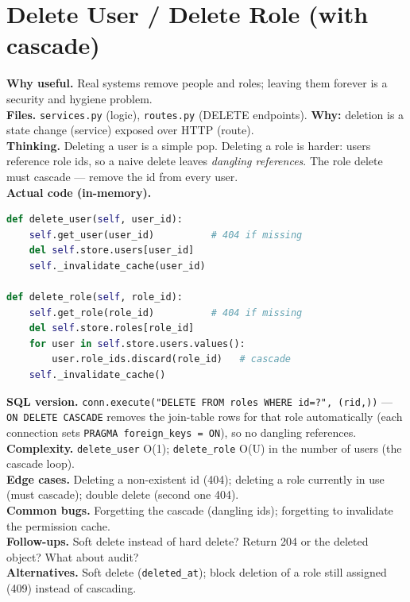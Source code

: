 \documentclass[11pt,a4paper]{report}
\begin{document}
\section{Delete User / Delete Role (with cascade)}
\textbf{Why useful.} Real systems remove people and roles; leaving them forever
is a security and hygiene problem.\\
\textbf{Files.} \texttt{services.py} (logic), \texttt{routes.py} (DELETE
endpoints). \textbf{Why:} deletion is a state change (service) exposed over HTTP
(route).\\
\textbf{Thinking.} Deleting a user is a simple pop. Deleting a role is harder:
users reference role ids, so a naive delete leaves \emph{dangling references}.
The role delete must cascade --- remove the id from every user.\\
\textbf{Actual code (in-memory).}
\begin{lstlisting}[language=Python]
def delete_user(self, user_id):
    self.get_user(user_id)          # 404 if missing
    del self.store.users[user_id]
    self._invalidate_cache(user_id)

def delete_role(self, role_id):
    self.get_role(role_id)          # 404 if missing
    del self.store.roles[role_id]
    for user in self.store.users.values():
        user.role_ids.discard(role_id)   # cascade
    self._invalidate_cache()
\end{lstlisting}
\textbf{SQL version.} \texttt{conn.execute("DELETE FROM roles WHERE id=?", (rid,))}
--- \texttt{ON DELETE CASCADE} removes the join-table rows for that role
automatically (each connection sets \texttt{PRAGMA foreign\_keys = ON}), so no
dangling references.\\
\textbf{Complexity.} \texttt{delete\_user} O(1); \texttt{delete\_role} O(U) in
the number of users (the cascade loop).\\
\textbf{Edge cases.} Deleting a non-existent id (404); deleting a role currently
in use (must cascade); double delete (second one 404).\\
\textbf{Common bugs.} Forgetting the cascade (dangling ids); forgetting to
invalidate the permission cache.\\
\textbf{Follow-ups.} Soft delete instead of hard delete? Return 204 or the
deleted object? What about audit?\\
\textbf{Alternatives.} Soft delete (\texttt{deleted\_at}); block deletion of a
role still assigned (409) instead of cascading.
\end{document}

